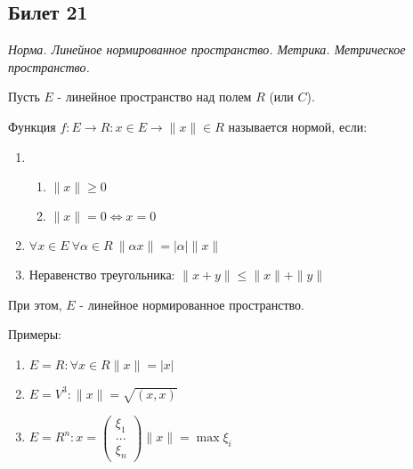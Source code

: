\subsection{Билет 21}

\textit{Норма. Линейное нормированное пространство. Метрика. Метрическое пространство.}

Пусть $E$ - линейное пространство над полем $R$ (или $C$). 

Функция $f:E\to R: x \in E \to \| x \| \in R$ называется нормой, если:
\begin{enumerate}
 \item \begin{enumerate}
        \item $\|x\| \ge 0$
        \item $\|x\| = 0 \Leftrightarrow x = 0$
       \end{enumerate}
 \item $\forall x \in E ~ \forall \alpha \in R ~ \|\alpha x \| = \left| \alpha \right| \|x\|$
 \item Неравенство треугольника: $\|x+y\| \le \|x\| + \|y\|$
\end{enumerate}

При этом, $E$ - линейное нормированное пространство.

Примеры:

\begin{enumerate}
 \item $E = R: \forall x \in R \|x\| = \left| x \right|$
 \item $E = V^3: \|x\| = \sqrt{(x,x)}$
 \item $E = R^n: x = \left(\begin{matrix}
                            \mbox{$\xi_1$}\\
                            \mbox{...}\\
                            \mbox{$\xi_n$}
                           \end{matrix}\right) \|x\| = \max \xi_i$

\end{enumerate}

